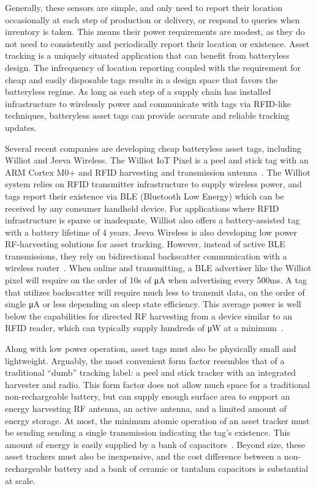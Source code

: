 Generally, these sensors are simple, and only need to report their location occasionally at each step of production or delivery, or respond to queries when inventory is taken. 
This means their power requirements are modest, as 
they do not need to consistently and periodically report their location or existence.
Asset tracking is a uniquely situated application that can benefit from batteryless design.
The infrequency of location reporting coupled with the requirement for cheap and easily disposable tags results in a design space that favors the batteryless regime.
As long as each step of a supply chain has installed infrastructure to wirelessly power and communicate with tags via RFID-like techniques, batteryless asset tags can provide accurate and reliable tracking updates.

Several recent companies are developing cheap batteryless asset tags, including Williot and Jeeva Wireless.
The Williot IoT Pixel is a peel and stick tag with an ARM Cortex M0+ and RFID harvesting and transmission antenna~\cite{williotpixel}.
The Williot system relies on RFID transmitter infrastructure to supply wireless power, and tags report their existence via BLE (Bluetooth Low Energy) which can be received by any consumer handheld device.
For applications where RFID infrastructure is sparse or inadequate, Williot also offers a battery-assisted tag with a battery lifetime of 4 years.
Jeeva Wireless is also developing low power RF-harvesting solutions for asset tracking. However, instead of active BLE transmissions, they rely on bidirectional backscatter communication with a wireless router~\cite{jeevawireless}.
When online and transmitting, a BLE advertiser like the Williot pixel will require on the order of 10s of \si{\micro\ampere} when advertising every 500\si{\milli\second}. A tag that utilizes backscatter will require much less to transmit data, on the order of single \si{\micro\ampere} or less depending on sleep state efficiency. This average power is well below the capabilities for directed RF harvesting from a device similar to an RFID reader, which can typically supply hundreds of \si{\micro\watt} at a minimum~\cite{sample2008design}.

Along with low power operation, asset tags must also be physically small and lightweight. 
Arguably, the most convenient form factor resembles that of a traditional ``dumb'' tracking label: a peel and stick tracker with an integrated harvester and radio. 
This form factor does not allow much space for a traditional non-rechargeable battery, but can supply enough surface area to support an energy harvesting RF antenna, an active antenna, and a limited amount of energy storage.
At most, the minimum atomic operation of an asset tracker must be sending 
sending a single transmission indicating the tag's existence. 
This amount of energy is easily supplied by a bank of capacitors~\cite{debruin2013monjolo, campbellEnergy14, yervaGrafting12}. 
Beyond size, these asset trackers must also be inexpensive, and the cost difference between a non-rechargeable battery and a bank of ceramic or tantalum capacitors is substantial at scale. 

